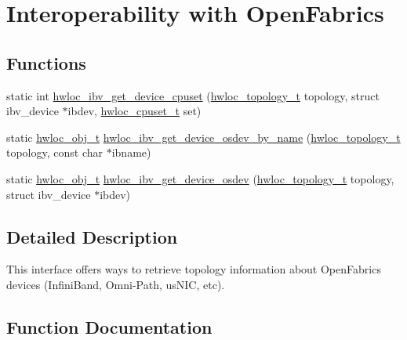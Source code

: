 \hypertarget{a00224}{}\section{Interoperability with Open\+Fabrics}
\label{a00224}
\subsection*{Functions}
\begin{DoxyCompactItemize}
\item 
static int \hyperlink{a00224_ga3ea0d838c1e7f1671b35687aae2da6ae}{hwloc\+\_\+ibv\+\_\+get\+\_\+device\+\_\+cpuset} (\hyperlink{a00186_ga9d1e76ee15a7dee158b786c30b6a6e38}{hwloc\+\_\+topology\+\_\+t} topology, struct ibv\+\_\+device $\ast$ibdev, \hyperlink{a00183_ga4bbf39b68b6f568fb92739e7c0ea7801}{hwloc\+\_\+cpuset\+\_\+t} set)
\item 
static \hyperlink{a00185_ga79b8ab56877ef99ac59b833203391c7d}{hwloc\+\_\+obj\+\_\+t} \hyperlink{a00224_ga31d794567f4420bbdc8baa7bf8bf6138}{hwloc\+\_\+ibv\+\_\+get\+\_\+device\+\_\+osdev\+\_\+by\+\_\+name} (\hyperlink{a00186_ga9d1e76ee15a7dee158b786c30b6a6e38}{hwloc\+\_\+topology\+\_\+t} topology, const char $\ast$ibname)
\item 
static \hyperlink{a00185_ga79b8ab56877ef99ac59b833203391c7d}{hwloc\+\_\+obj\+\_\+t} \hyperlink{a00224_ga7324cdfd5db6ed2669c051ef7e1b64e1}{hwloc\+\_\+ibv\+\_\+get\+\_\+device\+\_\+osdev} (\hyperlink{a00186_ga9d1e76ee15a7dee158b786c30b6a6e38}{hwloc\+\_\+topology\+\_\+t} topology, struct ibv\+\_\+device $\ast$ibdev)
\end{DoxyCompactItemize}


\subsection{Detailed Description}
This interface offers ways to retrieve topology information about Open\+Fabrics devices (Infini\+Band, Omni-\/\+Path, us\+N\+IC, etc). 

\subsection{Function Documentation}
\mbox{\label{a00224_ga3ea0d838c1e7f1671b35687aae2da6ae}} 
